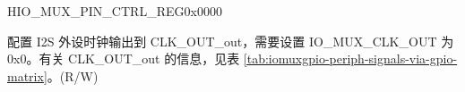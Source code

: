 \begin{register}{H}{IO\_MUX\_PIN\_CTRL\_REG}{0x0000}\label{regdesc:IOMUXPINCTRLREG}
%
%
%
%
\regnewline%
\begin{regdesc}\begin{reglist}
\label{fielddesc:IOMUXCLKOUT1}\item [IO\_MUX\_CLK\_OUT\regindex{x}] 配置 I2S 外设时钟输出到 CLK\_OUT\_out，需要设置 IO\_MUX\_CLK\_OUT 为 0x0。有关 CLK\_OUT\_out 的信息，见表 \ref{tab:iomuxgpio-periph-signals-via-gpio-matrix}。(R/W)
\end{reglist}\end{regdesc}
\end{register}


